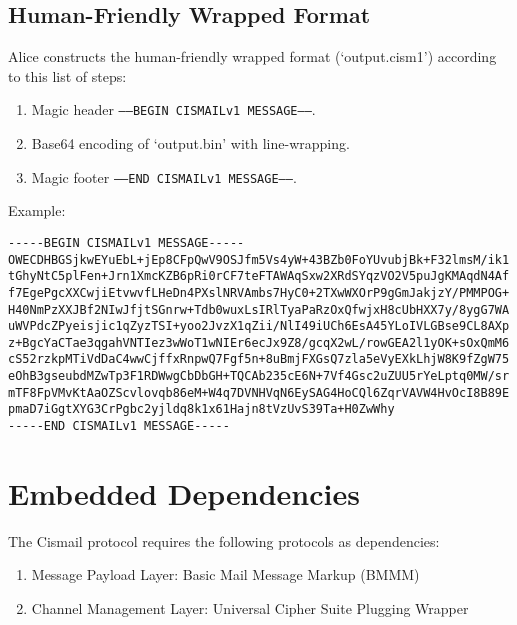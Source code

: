 \documentclass[a4paper,11pt]{article}
\begin{document}
\subsection{Human-Friendly Wrapped Format}

Alice constructs the human-friendly wrapped format (`output.cism1') according to this list of steps:

\begin{enumerate}
	\item Magic header \texttt{-----BEGIN CISMAILv1 MESSAGE-----}.
	\item Base64 encoding of `output.bin' with line-wrapping.
	\item Magic footer \texttt{-----END CISMAILv1 MESSAGE-----}.
\end{enumerate}

Example:

\begin{lstlisting}
-----BEGIN CISMAILv1 MESSAGE-----
OWECDHBGSjkwEYuEbL+jEp8CFpQwV9OSJfm5Vs4yW+43BZb0FoYUvubjBk+F32lmsM/ik1
tGhyNtC5plFen+Jrn1XmcKZB6pRi0rCF7teFTAWAqSxw2XRdSYqzVO2V5puJgKMAqdN4Af
f7EgePgcXXCwjiEtvwvfLHeDn4PXslNRVAmbs7HyC0+2TXwWXOrP9gGmJakjzY/PMMPOG+
H40NmPzXXJBf2NIwJfjtSGnrw+Tdb0wuxLsIRlTyaPaRzOxQfwjxH8cUbHXX7y/8ygG7WA
uWVPdcZPyeisjic1qZyzTSI+yoo2JvzX1qZii/NlI49iUCh6EsA45YLoIVLGBse9CL8AXp
z+BgcYaCTae3qgahVNTIez3wWoT1wNIEr6ecJx9Z8/gcqX2wL/rowGEA2l1yOK+sOxQmM6
cS52rzkpMTiVdDaC4wwCjffxRnpwQ7Fgf5n+8uBmjFXGsQ7zla5eVyEXkLhjW8K9fZgW75
eOhB3gseubdMZwTp3F1RDWwgCbDbGH+TQCAb235cE6N+7Vf4Gsc2uZUU5rYeLptq0MW/sr
mTF8FpVMvKtAaOZScvlovqb86eM+W4q7DVNHVqN6EySAG4HoCQl6ZqrVAVW4HvOcI8B89E
pmaD7iGgtXYG3CrPgbc2yjldq8k1x61Hajn8tVzUvS39Ta+H0ZwWhy
-----END CISMAILv1 MESSAGE-----
\end{lstlisting}






\section{Embedded Dependencies}

The Cismail protocol requires the following protocols as dependencies:

\begin{enumerate}
	\item Message Payload Layer: Basic Mail Message Markup (BMMM)
	\item Channel Management Layer: Universal Cipher Suite Plugging Wrapper
\end{enumerate}
\end{document}
